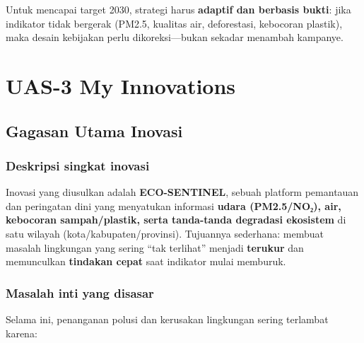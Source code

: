 \documentclass[
  letterpaper,
  DIV=11,
  numbers=noendperiod]{scrreprt}
\begin{document}
\begin{tcolorbox}[enhanced jigsaw, colback=white, colframe=quarto-callout-important-color-frame, left=2mm, arc=.35mm, bottomrule=.15mm, opacityback=0, opacitybacktitle=0.6, coltitle=black, toprule=.15mm, colbacktitle=quarto-callout-important-color!10!white, breakable, titlerule=0mm, leftrule=.75mm, title=\textcolor{quarto-callout-important-color}{\faExclamation}\hspace{0.5em}{Implikasi Kebijakan}, toptitle=1mm, bottomtitle=1mm, rightrule=.15mm]

Untuk mencapai target 2030, strategi harus \textbf{adaptif dan berbasis
bukti}: jika indikator tidak bergerak (PM2.5, kualitas air, deforestasi,
kebocoran plastik), maka desain kebijakan perlu dikoreksi---bukan
sekadar menambah kampanye.

\end{tcolorbox}


\chapter{UAS-3 My Innovations}\label{uas-3-my-innovations}

\section{Gagasan Utama Inovasi}\label{gagasan-utama-inovasi}

\subsection{Deskripsi singkat inovasi}\label{deskripsi-singkat-inovasi}

Inovasi yang diusulkan adalah \textbf{ECO-SENTINEL}, sebuah platform
pemantauan dan peringatan dini yang menyatukan informasi \textbf{udara
(PM2.5/NO₂), air, kebocoran sampah/plastik, serta tanda-tanda degradasi
ekosistem} di satu wilayah (kota/kabupaten/provinsi). Tujuannya
sederhana: membuat masalah lingkungan yang sering ``tak terlihat''
menjadi \textbf{terukur} dan memunculkan \textbf{tindakan cepat} saat
indikator mulai memburuk.

\subsection{Masalah inti yang disasar}\label{masalah-inti-yang-disasar}

Selama ini, penanganan polusi dan kerusakan lingkungan sering terlambat
karena:
\end{document}
